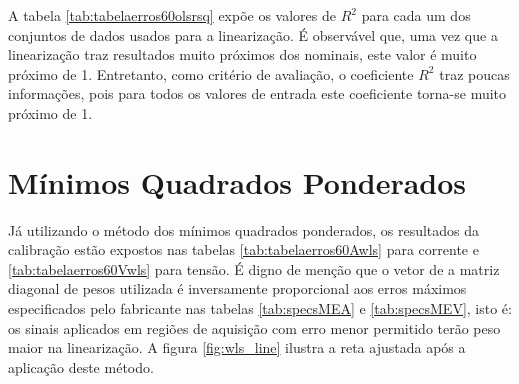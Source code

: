 A tabela \ref{tab:tabelaerros60olsrsq} expõe os valores de $R^2$ para cada um dos conjuntos de dados usados para a linearização. É observável que, uma vez que a linearização traz resultados muito próximos dos nominais, este valor é muito próximo de 1. Entretanto, como critério de avaliação, o coeficiente $R^2$ traz poucas informações, pois para todos os valores de entrada este coeficiente torna-se muito próximo de 1.

\begin{table}[H]
\end{table}


\section{Mínimos Quadrados Ponderados}

Já utilizando o método dos mínimos quadrados ponderados, os resultados da calibração estão expostos nas tabelas \ref{tab:tabelaerros60Awls} para corrente e \ref{tab:tabelaerros60Vwls} para tensão. É digno de menção que o vetor de a matriz diagonal de pesos utilizada é inversamente proporcional aos erros máximos especificados pelo fabricante nas tabelas \ref{tab:specsMEA} e \ref{tab:specsMEV}, isto é: os sinais aplicados em regiões de aquisição com erro menor permitido terão peso maior na linearização. A figura \ref{fig:wls_line} ilustra a reta ajustada após a aplicação deste método.

